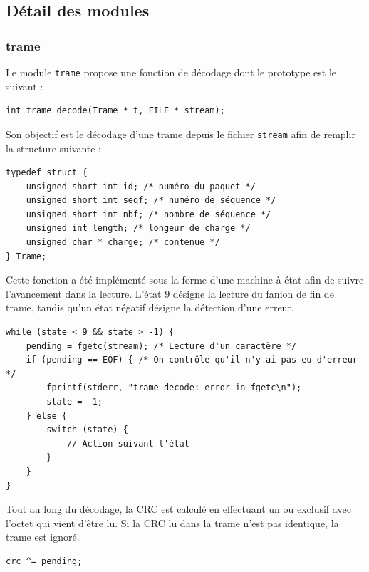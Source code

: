 \documentclass[a4paper,11pt]{article}
\begin{document}
\subsection{Détail des modules}

\subsubsection{trame}
Le module \texttt{trame} propose une fonction de décodage dont le prototype est le suivant :
\begin{verbatim}
int trame_decode(Trame * t, FILE * stream);
\end{verbatim}
Son objectif est le décodage d'une trame depuis le fichier \texttt{stream} afin de remplir la structure suivante :
\begin{verbatim}
typedef struct {
    unsigned short int id; /* numéro du paquet */
    unsigned short int seqf; /* numéro de séquence */
    unsigned short int nbf; /* nombre de séquence */
    unsigned int length; /* longeur de charge */
    unsigned char * charge; /* contenue */
} Trame;
\end{verbatim}
Cette fonction a été implémenté sous la forme d'une machine à état afin
de suivre l'avancement dans la lecture. L'état $9$ désigne la lecture du
fanion de fin de trame, tandis qu'un état négatif désigne la détection
d'une erreur.
\begin{verbatim}
while (state < 9 && state > -1) {
    pending = fgetc(stream); /* Lecture d'un caractère */
    if (pending == EOF) { /* On contrôle qu'il n'y ai pas eu d'erreur */
        fprintf(stderr, "trame_decode: error in fgetc\n");
        state = -1; 
    } else {
        switch (state) {
            // Action suivant l'état
        }
    }
}
\end{verbatim}
Tout au long du décodage, la CRC est calculé en effectuant un ou exclusif
avec l'octet qui vient d'être lu. Si la CRC lu dans la trame n'est pas
identique, la trame est ignoré.
\begin{verbatim}
crc ^= pending;
\end{verbatim}
\end{document}
